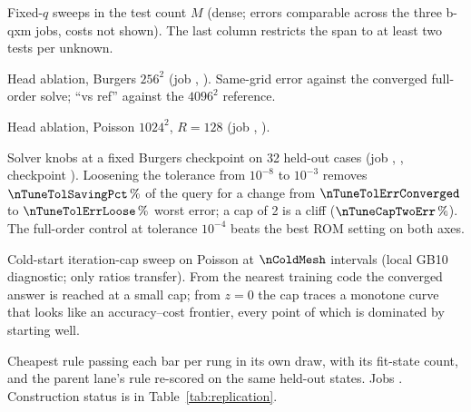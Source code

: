 \begin{table}[h]
\centering
\caption{Fixed-$q$ sweeps in the test count $M$ (dense; errors comparable
across the three b-qxm jobs, costs not shown). The last column restricts the
span to at least two tests per unknown.}
\label{tab:qxm-fixedq}
\resizebox{\linewidth}{!}{}
\end{table}

\begin{table}[h]
\centering
\caption{Head ablation, Burgers $256^2$ (job \provAblBurgersJob,
\provAblBurgersGpu). Same-grid error against the converged full-order solve;
``vs ref'' against the $4096^2$ reference.}
\label{tab:head-burgers}
\resizebox{\linewidth}{!}{}
\end{table}

\begin{table}[h]
\centering
\caption{Head ablation, Poisson $1024^2$, $R=128$ (job \provAblPoissonJob,
\provAblPoissonGpu).}
\label{tab:head-poisson}

\end{table}

\begin{table}[h]
\centering
\caption{Solver knobs at a fixed Burgers checkpoint on 32 held-out cases (job
\provTuneJob, \provTuneGpu, checkpoint \provTuneCkpt). Loosening the
tolerance from $10^{-8}$ to $10^{-3}$ removes $\nTuneTolSavingPct\,\%$ of the
query for a change from $\nTuneTolErrConverged$ to $\nTuneTolErrLoose\,\%$
worst error; a cap of 2 is a cliff ($\nTuneCapTwoErr\,\%$). The full-order
control at tolerance $10^{-4}$ beats the best ROM setting on both axes.}
\label{tab:knobs}

\end{table}

\begin{table}[h]
\centering
\caption{Cold-start iteration-cap sweep on Poisson at $\nColdMesh$ intervals
(local GB10 diagnostic; only ratios transfer). From the nearest training code
the converged answer is reached at a small cap; from $z=0$ the cap traces a
monotone curve that looks like an accuracy--cost frontier, every point of
which is dominated by starting well.}
\label{tab:coldstart}

\end{table}

\begin{table}[h]
\centering
\caption{Cheapest rule passing each bar per rung in its own draw, with its
fit-state count, and the parent lane's rule re-scored on the same held-out
states. Jobs \provEqtopJobs. Construction status is in
Table~\ref{tab:replication}.}
\label{tab:eqcert}

\end{table}

